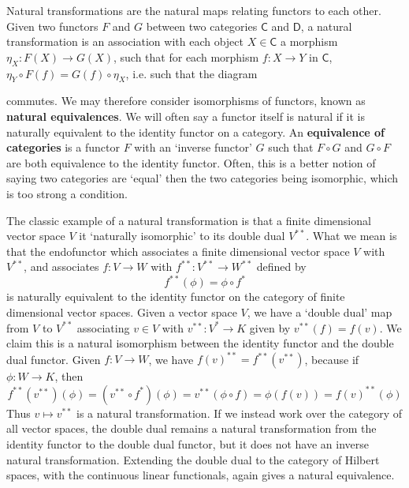 Natural transformations are the natural maps relating functors to each other. Given two functors $F$ and $G$ between two categories $\mathsf{C}$ and $\mathsf{D}$, a natural transformation is an association with each object $X \in \mathsf{C}$ a morphism $\eta_X: F(X) \to G(X)$, such that for each morphism $f: X \to Y$ in $\mathsf{C}$, $\eta_Y \circ F(f) = G(f) \circ \eta_X$, i.e. such that the diagram
%
\begin{center}
\end{center}
%
commutes. We may therefore consider isomorphisms of functors, known as {\bf natural equivalences}. We will often say a functor itself is natural if it is naturally equivalent to the identity functor on a category. An {\bf equivalence of categories} is a functor $F$ with an `inverse functor' $G$ such that $F \circ G$ and $G \circ F$ are both equivalence to the identity functor. Often, this is a better notion of saying two categories are `equal' then the two categories being isomorphic, which is too strong a condition.

\begin{example}
    The classic example of a natural transformation is that a finite dimensional vector space $V$ it `naturally isomorphic' to its double dual $V^{**}$. What we mean is that the endofunctor which associates a finite dimensional vector space $V$ with $V^{**}$, and associates $f: V \to W$ with $f^{**}: V^{**} \to W^{**}$ defined by
    \[ f^{**}(\phi) = \phi \circ f^* \]
    is naturally equivalent to the identity functor on the category of finite dimensional vector spaces. Given a vector space $V$, we have a `double dual' map from $V$ to $V^{**}$ associating $v \in V$ with $v^{**}: V^* \to K$ given by $v^{**}(f) = f(v)$. We claim this is a natural isomorphism between the identity functor and the double dual functor. Given $f: V \to W$, we have $f(v)^{**} = f^{**}(v^{**})$, because if $\phi: W \to K$, then
    \[ f^{**}(v^{**})(\phi) = (v^{**} \circ f^*)(\phi) = v^{**}(\phi \circ f) = \phi(f(v)) = f(v)^{**}(\phi) \]
    Thus $v \mapsto v^{**}$ is a natural transformation. If we instead work over the category of all vector spaces, the double dual remains a natural transformation from the identity functor to the double dual functor, but it does not have an inverse natural transformation. Extending the double dual to the category of Hilbert spaces, with the continuous linear functionals, again gives a natural equivalence.
\end{example}

